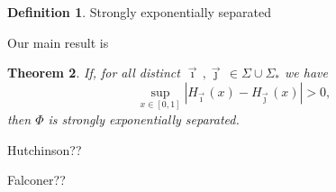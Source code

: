 \documentclass[12pt,]{article}
\newtheorem{theorem}{Theorem}[section]
\theoremstyle{definition}
\newtheorem{definition}[theorem]{Definition}
\theoremstyle{remark}
\newcommand{\0}{\mathbf{0}}
\newcommand{\bi}{\vec{\imath}\,}
\newcommand{\bj}{\vec{\jmath}\,}
\begin{document}
\begin{definition}
  Strongly exponentially separated
\end{definition}

Our main result is
\begin{theorem}
  If, for all distinct $\bi,\bj \in\Sigma\cup\Sigma_*$ we have
  \[
    \sup_{x\in[0,1]} |H_{\bi}(x) - H_{\bj}(x)| > 0,
  \]
  then $\Phi$ is strongly exponentially separated.
\end{theorem}


\begin{thebibliography}{99}
  Hutchinson??

  Falconer??

\end{thebibliography}
\end{document}
